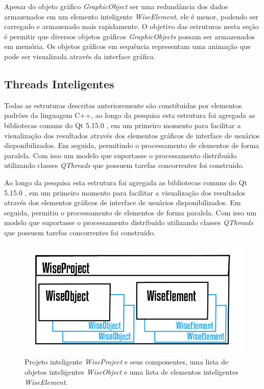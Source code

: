 \documentclass[a4paper,12pt]{monografia}
\theoremstyle{plain}
\theoremstyle{definition}
\theoremstyle{remark}
\begin{document}
Apesar do objeto gráfico \textit{GraphicObject} ser uma redundância dos dados armazenados em um elemento inteligente \textit{WiseElement}, ele é menor, podendo ser carregado e armazenado mais rapidamente. O objetivo das estruturas nesta seção é permitir que diversos objetos gráficos \textit{GraphicObjects} possam ser armazenados em memória. Os objetos gráficos em sequência representam uma animação que pode ser visualizada através da interface gráfica. 


\subsection{Threads Inteligentes}\label{sec:threads}

Todas as estruturas descritas anterioremente são constítuidas por elementos padrões da linguagem C++, ao longo da pesquisa esta estrutura foi agregada as bibliotecas comuns do Qt 5.15.0 \cite{QTClasses}, em um primeiro momento para facilitar a visualização dos resultados através dos elementos gráficos de interface de usuários disponibilizados. Em seguida, permitindo o processamento de elementos de forma paralela. Com isso um modelo que suportasse o processamento distribuído utilizando classes \textit{QThreads} que possuem tarefas concorrentes foi construído.

Ao longo da pesquisa esta estrutura foi agregada as bibliotecas comuns do Qt 5.15.0 \cite{QTClasses}, em um primeiro momento para facilitar a visualização dos resultados através dos elementos gráficos de interface de usuários disponibilizados. Em seguida, permitiu o processamento de elementos de forma paralela. Com isso um modelo que suportasse o processamento distribuído utilizando classes \textit{QThreads} que possuem tarefas concorrentes foi construído.


\begin{figure}[!htbp]
	\centering
	\includegraphics[scale=1]{Figures/WiseProject.png}
	\caption{Projeto inteligente \textit{WiseProject} e seus componentes, uma lista de objetos inteligentes \textit{WiseObject} e uma lista de elementos inteligentes \textit{WiseElement}.}
	\label{fig7:project}
\end{figure}
\end{document}
